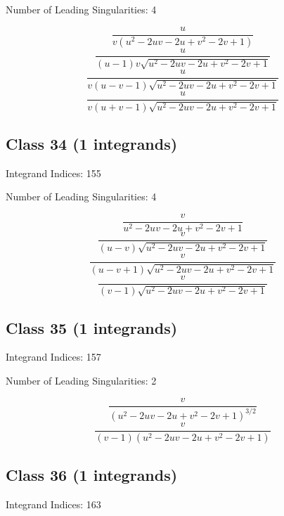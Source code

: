 \documentclass[11pt,a4paper]{article}
\begin{document}
Number of Leading Singularities: 4

\begin{equation}
\frac{u}{v \left(u^2-2 u v-2 u+v^2-2 v+1\right)}
\end{equation}
\begin{equation}
\frac{u}{(u-1) v \sqrt{u^2-2 u v-2 u+v^2-2 v+1}}
\end{equation}
\begin{equation}
\frac{u}{v (u-v-1) \sqrt{u^2-2 u v-2 u+v^2-2 v+1}}
\end{equation}
\begin{equation}
\frac{u}{v (u+v-1) \sqrt{u^2-2 u v-2 u+v^2-2 v+1}}
\end{equation}


\subsection*{Class 34 (1 integrands)}
Integrand Indices: 155

Number of Leading Singularities: 4

\begin{equation}
\frac{v}{u^2-2 u v-2 u+v^2-2 v+1}
\end{equation}
\begin{equation}
\frac{v}{(u-v) \sqrt{u^2-2 u v-2 u+v^2-2 v+1}}
\end{equation}
\begin{equation}
\frac{v}{(u-v+1) \sqrt{u^2-2 u v-2 u+v^2-2 v+1}}
\end{equation}
\begin{equation}
\frac{v}{(v-1) \sqrt{u^2-2 u v-2 u+v^2-2 v+1}}
\end{equation}


\subsection*{Class 35 (1 integrands)}
Integrand Indices: 157

Number of Leading Singularities: 2

\begin{equation}
\frac{v}{\left(u^2-2 u v-2 u+v^2-2 v+1\right)^{3/2}}
\end{equation}
\begin{equation}
\frac{v}{(v-1) \left(u^2-2 u v-2 u+v^2-2 v+1\right)}
\end{equation}


\subsection*{Class 36 (1 integrands)}
Integrand Indices: 163
\end{document}
